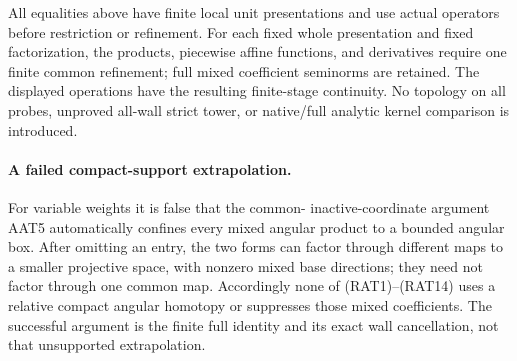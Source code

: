 All equalities above have finite local unit
presentations and use actual operators before
restriction or refinement.  For each fixed whole
presentation and fixed factorization, the products,
piecewise affine functions, and derivatives require
one finite common refinement; full mixed coefficient
seminorms are retained.  The displayed operations
have the resulting finite-stage continuity.  No
topology on all probes, unproved all-wall strict
tower, or native/full analytic kernel comparison
is introduced.

\paragraph{A failed compact-support extrapolation.}
For variable weights it is false that the common-
inactive-coordinate argument AAT5 automatically
confines every mixed angular product to a bounded
angular box.  After omitting an entry, the two
forms can factor through different maps to a
smaller projective space, with nonzero mixed base
directions; they need not factor through one common
map.  Accordingly none of (RAT1)--(RAT14) uses a
relative compact angular homotopy or suppresses
those mixed coefficients.  The successful argument
is the finite full identity and its exact wall
cancellation, not that unsupported extrapolation.
